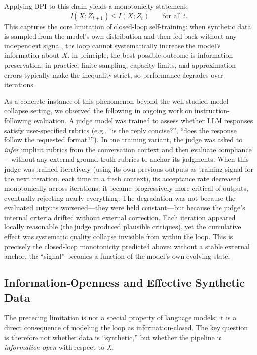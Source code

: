 \documentclass{article}
\theoremstyle{plain}
\theoremstyle{definition}
\theoremstyle{remark}
\begin{document}
Applying DPI to this chain yields a monotonicity statement:
\[
I(X;Z_{t+1})  \le  I(X;Z_t)\qquad \text{for all } t.
\]
This captures the core limitation of closed-loop self-training: when synthetic data is sampled from the model's own distribution and then fed back without any independent signal, the loop cannot systematically increase the model's information about $X$. In principle, the best possible outcome is information preservation; in practice, finite sampling, capacity limits, and approximation errors typically make the inequality strict, so performance degrades over iterations.

As a concrete instance of this phenomenon beyond the well-studied model collapse setting, we observed the following in ongoing work on instruction-following evaluation. A judge model was trained to assess whether LLM responses satisfy user-specified rubrics (e.g., ``is the reply concise?'', ``does the response follow the requested format?''). In one training variant, the judge was asked to \textit{infer} implicit rubrics from the conversation context and then evaluate compliance---without any external ground-truth rubrics to anchor its judgments. When this judge was trained iteratively (using its own previous outputs as training signal for the next iteration, each time in a fresh context), its acceptance rate decreased monotonically across iterations: it became progressively more critical of outputs, eventually rejecting nearly everything. The degradation was not because the evaluated outputs worsened---they were held constant---but because the judge's internal criteria drifted without external correction. Each iteration appeared locally reasonable (the judge produced plausible critiques), yet the cumulative effect was systematic quality collapse invisible from within the loop. This is precisely the closed-loop monotonicity predicted above: without a stable external anchor, the ``signal'' becomes a function of the model's own evolving state.

\subsection{Information-Openness and Effective Synthetic Data}
\label{sec:openness}

The preceding limitation is not a special property of language models; it is a direct consequence of modeling the loop as information-closed. The key question is therefore not whether data is ``synthetic,'' but whether the pipeline is \textit{information-open} with respect to $X$.
\end{document}
